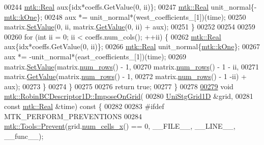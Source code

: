 \begin{DoxyCode}
00244       \hyperlink{group__c01-roots_gac080bbbf5cbb5502c9f00405f894857d}{mtk::Real} aux\{idx*coeffs.GetValue(0, ii)\};
00247       \hyperlink{group__c01-roots_gac080bbbf5cbb5502c9f00405f894857d}{mtk::Real} unit\_normal\{-\hyperlink{group__c01-roots_ga26407c24d43b6b95480943340d285c71}{mtk::kOne}\};
00248       aux *= unit\_normal*(west\_coefficients\_[1])(time);
00250       matrix.\hyperlink{classmtk_1_1DenseMatrix_a784ce5784109ac86bfb9d8562b334b13}{SetValue}(0, ii, matrix.\hyperlink{classmtk_1_1DenseMatrix_a4b23ecbebd970b5eea915dbb50691024}{GetValue}(0, ii) + aux);
00251     \}
00252 
00254 
00259 
00260     \textcolor{keywordflow}{for} (\textcolor{keywordtype}{int} ii = 0; ii < coeffs.num\_cols(); ++ii) \{
00262       \hyperlink{group__c01-roots_gac080bbbf5cbb5502c9f00405f894857d}{mtk::Real} aux\{idx*coeffs.GetValue(0, ii)\};
00266       \hyperlink{group__c01-roots_gac080bbbf5cbb5502c9f00405f894857d}{mtk::Real} unit\_normal\{\hyperlink{group__c01-roots_ga26407c24d43b6b95480943340d285c71}{mtk::kOne}\};
00267       aux *= -unit\_normal*(east\_coefficients\_[1])(time);
00269       matrix.\hyperlink{classmtk_1_1DenseMatrix_a784ce5784109ac86bfb9d8562b334b13}{SetValue}(matrix.\hyperlink{classmtk_1_1DenseMatrix_a53f3afb3b6a8d21854458aaa9663cc74}{num\_rows}() - 1,
00270                       matrix.\hyperlink{classmtk_1_1DenseMatrix_a53f3afb3b6a8d21854458aaa9663cc74}{num\_rows}() - 1 - ii,
00271                       matrix.\hyperlink{classmtk_1_1DenseMatrix_a4b23ecbebd970b5eea915dbb50691024}{GetValue}(matrix.\hyperlink{classmtk_1_1DenseMatrix_a53f3afb3b6a8d21854458aaa9663cc74}{num\_rows}() - 1,
00272                                       matrix.\hyperlink{classmtk_1_1DenseMatrix_a53f3afb3b6a8d21854458aaa9663cc74}{num\_rows}() - 1 -ii) + aux);
00273     \}
00274   \}
00275 
00276   \textcolor{keywordflow}{return} \textcolor{keyword}{true};
00277 \}
00278 
\hypertarget{mtk__robin__bc__descriptor__1d_8cc_source_l00279}{}\hyperlink{classmtk_1_1RobinBCDescriptor1D_ab0daec1d6c5c9c6768bea08281a3831d}{00279} \textcolor{keywordtype}{void} \hyperlink{classmtk_1_1RobinBCDescriptor1D_ab0daec1d6c5c9c6768bea08281a3831d}{mtk::RobinBCDescriptor1D::ImposeOnGrid}(
00280     \hyperlink{classmtk_1_1UniStgGrid1D}{UniStgGrid1D} &grid,
00281     \textcolor{keyword}{const} \hyperlink{group__c01-roots_gac080bbbf5cbb5502c9f00405f894857d}{mtk::Real} &time)\textcolor{keyword}{ const }\{
00282 
00283 \textcolor{preprocessor}{  #ifdef MTK\_PERFORM\_PREVENTIONS}
00284   \hyperlink{classmtk_1_1Tools_a332324c6f25e66be9dff48c5987a3b9f}{mtk::Tools::Prevent}(grid.\hyperlink{classmtk_1_1UniStgGrid1D_af1b3729d8afa07be5b2775ed68015b80}{num\_cells\_x}() == 0, \_\_FILE\_\_, \_\_LINE\_\_, \_\_func\_\_);

\end{DoxyCode}
